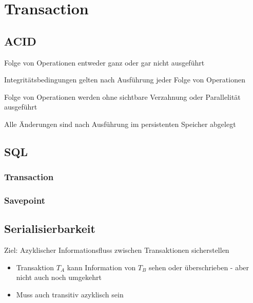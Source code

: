 \section{Transaction}
    \subsection{ACID}
    \begin{description}
    \setlength{\itemsep}{0pt} 
        \item[Atomicity] Folge von Operationen entweder ganz oder gar nicht ausgeführt
        \item[Consistency] Integritätsbedingungen gelten nach Ausführung jeder Folge von Operationen
        \item[Isolation] Folge von Operationen werden ohne sichtbare Verzahnung oder Parallelität ausgeführt
        \item[Durability] Alle Änderungen sind nach Ausführung im persistenten Speicher abgelegt
    \end{description}
    
    \subsection{SQL}
        \begin{multicols}{2}
        \subsubsection{Transaction}
            
        \subsubsection{Savepoint}
               
    \subsection{Serialisierbarkeit}
    Ziel: Azyklischer Informationsfluss zwischen Transaktionen sicherstellen
    \begin{itemize}
    \setlength{\itemsep}{0pt}
        \item Transaktion $T_A$ kann Information von $T_B$ sehen oder überschrieben - aber nicht auch noch umgekehrt
        \item Muss auch transitiv azyklisch sein
    \end{itemize}
    \end{multicols}
